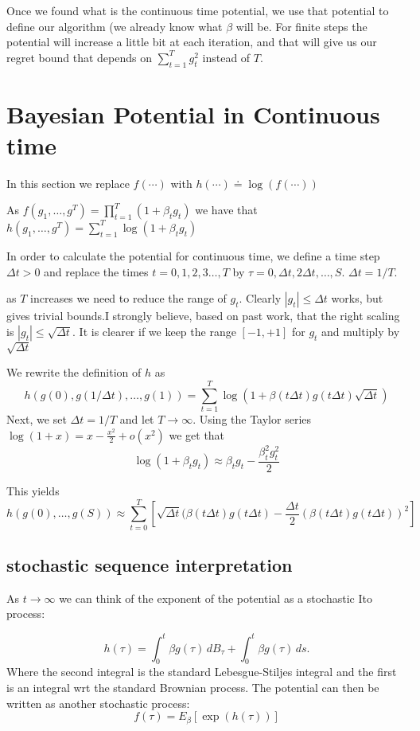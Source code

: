 \documentclass{article}
\begin{document}
Once we found what is the continuous time potential, we use that potential to define our algorithm (we already know what $\beta$ will be. For finite steps the potential will increase a little bit at each iteration, and that will give us our regret bound that depends on $\sum_{t=1}^T g_t^2$ instead of $T$.


\section{Bayesian Potential in Continuous time}

In this section we replace $f(\cdots)$ with $h(\cdots) \doteq \log(f(\cdots))$

As $f(g_1,\ldots,g^T) = \prod_{t=1}^T (1+\beta_t g_t)$ we have that 
$h(g_1,\ldots,g^T) = \sum_{t=1}^T \log(1+\beta_t g_t)$


\newcommand{\dt}{\Delta t}
In order to calculate the potential for continuous time, we define a time step $\dt>0$ and replace the times $t=0,1,2,3\ldots,T$ by $\tau=0,\dt,2\dt,\ldots,S$. $\dt=1/T$.

as $T$ increases we need to reduce the range of $g_t$. Clearly $|g_t| \leq \dt$ works, but gives trivial bounds.I strongly believe, based on past work, that the right scaling is $|g_t| \leq \sqrt{\dt}$. It is clearer if we keep the range $[-1,+1]$ for $g_t$ and multiply by $\sqrt{\dt}$

We rewrite the definition of $h$ as 
\[h(g(0),g(1/\dt),\ldots,g(1)) = \sum_{t=1}^T \log(1+\beta(t\dt) g(t\dt)\sqrt{\dt})
\]
Next, we set $\dt = 1/T$ and let $T \to \infty$. Using the Taylor series 
$\log(1+x) = x-\frac{x^2}{2} +o(x^2)$ we get that 
\[
\log(1+\beta_t g_t) \approx \beta_t g_t - \frac{\beta_t^2 g_t^2}{2}
\]


This yields
\[
h(g(0),\ldots,g(S)) \approx 
\sum_{t=0}^{T} 
\left[\sqrt{\dt}(\beta(t \dt) g(t\dt) - \frac{\dt}{2}(\beta(t \dt) g(t\dt))^2\right]
\]

\iffalse
\subsection{stochastic sequence interpretation}
As $t \to \infty$ we can think of the exponent of the potential as a stochastic Ito process: 

$$h(\tau) = \int_0^t \beta g(\tau)\,dB_\tau + \int_0^t \beta g(\tau)  \,ds.$$
Where the second integral is the standard Lebesgue-Stiljes integral and the first is an integral wrt the standard Brownian process. The potential can then be written as another stochastic process:
\[
f(\tau) = E_{\beta} \left[  \exp(h(\tau)) \right]
\]
\end{document}
